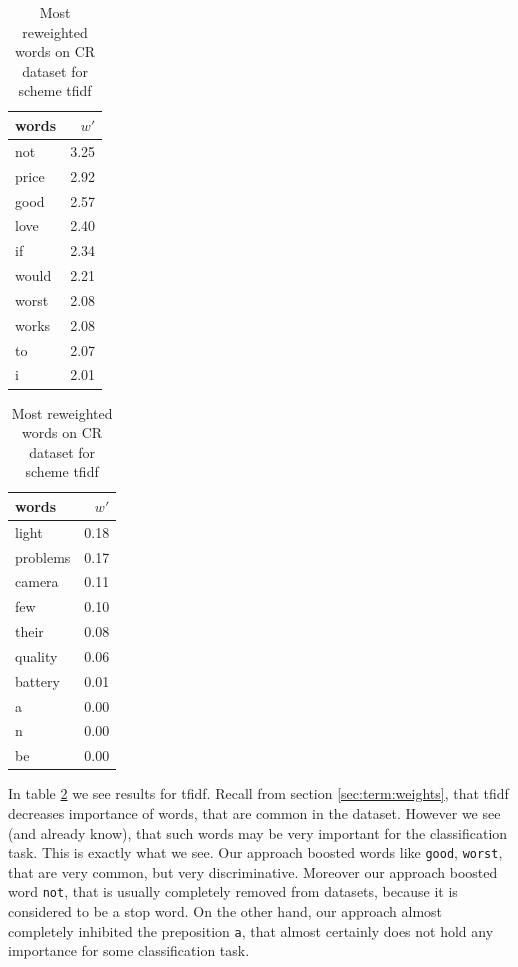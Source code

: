     
\begin{table}[h]
    \centering
    \begin{minipage}{.4\linewidth}
      \centering
        \begin{tabular}{lr}
\toprule
 words &  $w'$ \\
\midrule
   not &  3.25 \\
 price &  2.92 \\
  good &  2.57 \\
  love &  2.40 \\
    if &  2.34 \\
 would &  2.21 \\
 worst &  2.08 \\
 works &  2.08 \\
    to &  2.07 \\
     i &  2.01 \\
\bottomrule
\end{tabular}

    \end{minipage}
    \begin{minipage}{.4\linewidth}
      \centering
        \begin{tabular}{lr}
\toprule
    words &  $w'$ \\
\midrule
    light &  0.18 \\
 problems &  0.17 \\
   camera &  0.11 \\
      few &  0.10 \\
    their &  0.08 \\
  quality &  0.06 \\
  battery &  0.01 \\
        a &  0.00 \\
        n &  0.00 \\
       be &  0.00 \\
\bottomrule
\end{tabular}
    \end{minipage} 
    \caption{Most reweighted words on CR dataset for scheme tfidf}
    \label{tab:words:CR:tfidf}
\end{table}

    In table \ref{tab:words:CR:tfidf} we see results for tfidf. 
    Recall from section \ref{sec:term:weights}, that tfidf decreases importance of words, that are common in the dataset.
    However we see (and already know), that such words may be very important for the classification task.
    This is exactly what we see. 
    Our approach boosted words like \texttt{good}, \texttt{worst}, that are very common, but very discriminative.
    Moreover our approach boosted word \texttt{not}, that is usually completely removed from datasets, because it is considered to be a stop word. 
    On the other hand, our approach almost completely inhibited the preposition \texttt{a}, that almost certainly does not hold any importance for some classification task.


